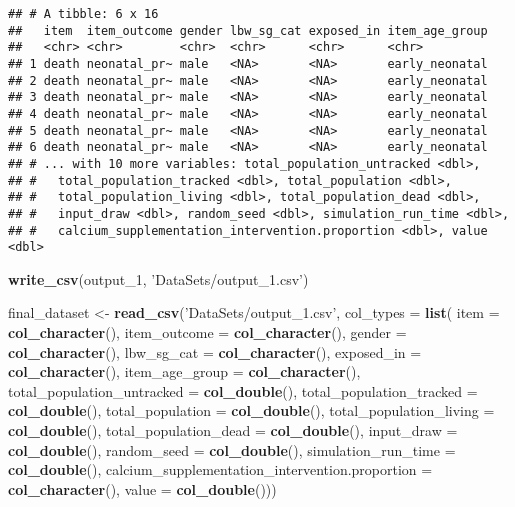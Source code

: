 \documentclass[]{article}
\newenvironment{Shaded}{\begin{snugshade}}{\end{snugshade}}
\newcommand{\DataTypeTok}[1]{\textcolor[rgb]{0.13,0.29,0.53}{#1}}
\newcommand{\DecValTok}[1]{\textcolor[rgb]{0.00,0.00,0.81}{#1}}
\newcommand{\KeywordTok}[1]{\textcolor[rgb]{0.13,0.29,0.53}{\textbf{#1}}}
\newcommand{\NormalTok}[1]{#1}
\newcommand{\StringTok}[1]{\textcolor[rgb]{0.31,0.60,0.02}{#1}}
\begin{document}
\begin{verbatim}
## # A tibble: 6 x 16
##   item  item_outcome gender lbw_sg_cat exposed_in item_age_group
##   <chr> <chr>        <chr>  <chr>      <chr>      <chr>         
## 1 death neonatal_pr~ male   <NA>       <NA>       early_neonatal
## 2 death neonatal_pr~ male   <NA>       <NA>       early_neonatal
## 3 death neonatal_pr~ male   <NA>       <NA>       early_neonatal
## 4 death neonatal_pr~ male   <NA>       <NA>       early_neonatal
## 5 death neonatal_pr~ male   <NA>       <NA>       early_neonatal
## 6 death neonatal_pr~ male   <NA>       <NA>       early_neonatal
## # ... with 10 more variables: total_population_untracked <dbl>,
## #   total_population_tracked <dbl>, total_population <dbl>,
## #   total_population_living <dbl>, total_population_dead <dbl>,
## #   input_draw <dbl>, random_seed <dbl>, simulation_run_time <dbl>,
## #   calcium_supplementation_intervention.proportion <dbl>, value <dbl>
\end{verbatim}

\begin{Shaded}
\begin{Highlighting}[]
\KeywordTok{write_csv}\NormalTok{(output_}\DecValTok{1}\NormalTok{, }\StringTok{'DataSets/output_1.csv'}\NormalTok{)}
\end{Highlighting}
\end{Shaded}

\begin{Shaded}
\begin{Highlighting}[]
\NormalTok{final_dataset <-}\StringTok{ }\KeywordTok{read_csv}\NormalTok{(}\StringTok{'DataSets/output_1.csv'}\NormalTok{,}
               \DataTypeTok{col_types =} \KeywordTok{list}\NormalTok{(}
                 \DataTypeTok{item =} \KeywordTok{col_character}\NormalTok{(),}
                 \DataTypeTok{item_outcome =} \KeywordTok{col_character}\NormalTok{(),}
                 \DataTypeTok{gender =} \KeywordTok{col_character}\NormalTok{(),}
                 \DataTypeTok{lbw_sg_cat =} \KeywordTok{col_character}\NormalTok{(),}
                 \DataTypeTok{exposed_in =} \KeywordTok{col_character}\NormalTok{(),}
                 \DataTypeTok{item_age_group =} \KeywordTok{col_character}\NormalTok{(),}
                 \DataTypeTok{total_population_untracked =} \KeywordTok{col_double}\NormalTok{(),}
                 \DataTypeTok{total_population_tracked =} \KeywordTok{col_double}\NormalTok{(),}
                 \DataTypeTok{total_population =} \KeywordTok{col_double}\NormalTok{(),}
                 \DataTypeTok{total_population_living =} \KeywordTok{col_double}\NormalTok{(),}
                 \DataTypeTok{total_population_dead =} \KeywordTok{col_double}\NormalTok{(),}
                 \DataTypeTok{input_draw =} \KeywordTok{col_double}\NormalTok{(),}
                 \DataTypeTok{random_seed =} \KeywordTok{col_double}\NormalTok{(),}
                 \DataTypeTok{simulation_run_time =} \KeywordTok{col_double}\NormalTok{(),}
                 \DataTypeTok{calcium_supplementation_intervention.proportion =} \KeywordTok{col_character}\NormalTok{(),}
                 \DataTypeTok{value =} \KeywordTok{col_double}\NormalTok{()))}
\end{Highlighting}
\end{Shaded}
\end{document}
